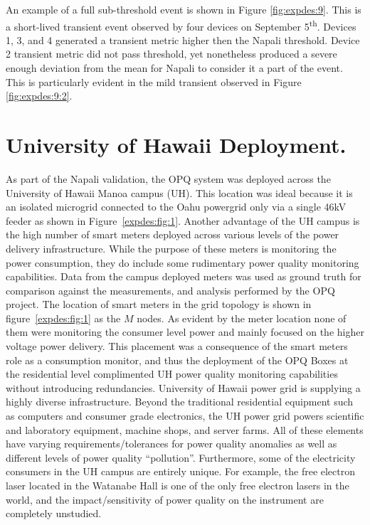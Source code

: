 An example of a full sub-threshold event is shown in Figure \ref{fig:expdes:9}.
This is a short-lived transient event observed by four devices on September 5\textsuperscript{th}.
Devices 1, 3, and 4 generated a transient metric higher then the Napali threshold.
Device 2 transient metric did not pass threshold, yet nonetheless produced a severe enough deviation from the mean for Napali to consider it a part of the event.
This is particularly evident in the mild transient observed in Figure \ref{fig:expdes:9:2}.

\section{University of Hawaii Deployment.}\label{sec:university-of-hawaii-deployment.}

As part of the Napali validation, the OPQ system was deployed across the University of Hawaii Manoa campus (UH).
This location was ideal because it is an isolated microgrid connected to the Oahu powergrid only via a single 46kV feeder as shown in Figure~\ref{expdes:fig:1}.
Another advantage of the UH campus is the high number of smart meters deployed across various levels of the power delivery infrastructure.
While the purpose of these meters is monitoring the power consumption, they do include some rudimentary power quality monitoring capabilities.
Data from the campus deployed meters was used as ground truth for comparison against the measurements, and analysis performed by the OPQ project.
The location of smart meters in the grid topology is shown in figure~\ref{expdes:fig:1} as the $M$ nodes.
As evident by the meter location none of them were monitoring the consumer level power and mainly focused on the higher voltage power delivery.
This placement was a consequence of the smart meters role as a consumption monitor, and thus the deployment of the OPQ Boxes at the residential level complimented UH power quality monitoring capabilities without introducing redundancies.
University of Hawaii power grid is supplying a highly diverse infrastructure.
Beyond the traditional residential equipment such as computers and consumer grade electronics, the UH power grid powers scientific and laboratory equipment, machine shops, and server farms.
All of these elements have varying requirements/tolerances for power quality anomalies as well as different levels of power quality ``pollution''.
Furthermore, some of the electricity consumers in the UH campus are entirely unique.
For example, the free electron laser located in the Watanabe Hall is one of the only free electron lasers in the world, and the impact/sensitivity of power quality on the instrument are completely unstudied.
